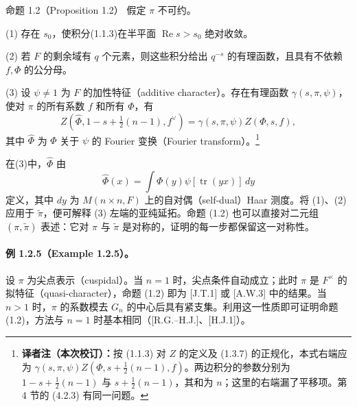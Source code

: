 \begin{originaltheorem}{命题 1.2（Proposition 1.2）}
假定 $\pi$ 不可约。

(1) 存在 $s_0$，使积分(1.1.3)在半平面 $\operatorname{Re}s>s_0$ 绝对收敛。

(2) 若 $F$ 的剩余域有 $q$ 个元素，则这些积分给出 $q^{-s}$ 的有理函数，且具有不依赖 $f,\Phi$ 的公分母。

(3) 设 $\psi\neq1$ 为 $F$ 的加性特征（additive character）。存在有理函数 $\gamma(s,\pi,\psi)$，使对 $\pi$ 的所有系数 $f$ 和所有 $\Phi$，有
\begin{equation}
 Z(\widehat\Phi,1-s+\tfrac12(n-1),f^\vee)
 =\gamma(s,\pi,\psi)Z(\Phi,s,f),\tag{1.2.3}
\end{equation}
其中 $\widehat\Phi$ 为 $\Phi$ 关于 $\psi$ 的 Fourier 变换（Fourier transform）。\footnote{\textbf{译者注（本次校订）：}按 (1.1.3) 对 $Z$ 的定义及 (1.3.7) 的正规化，本式右端应为 $\gamma(s,\pi,\psi)Z(\Phi,s+\tfrac12(n-1),f)$。两边积分的参数分别为 $1-s+\tfrac12(n-1)$ 与 $s+\tfrac12(n-1)$，其和为 $n$；这里的右端漏了平移项。第 4 节的 (4.2.3) 有同一问题。}
\end{originaltheorem}
在(3)中，$\widehat\Phi$ 由
\begin{equation}
 \widehat\Phi(x)=\int\Phi(y)\psi[\operatorname{tr}(yx)]\,dy\tag{1.2.4}
\end{equation}
定义，其中 $dy$ 为 $M(n\times n,F)$ 上的自对偶（self-dual）Haar 测度。将 (1)、(2) 应用于 $\widetilde\pi$，便可解释 (3) 左端的亚纯延拓。命题 (1.2) 也可以直接对二元组 $(\pi,\widetilde\pi)$ 表述：它对 $\pi$ 与 $\widetilde\pi$ 是对称的，证明的每一步都保留这一对称性。

\paragraph*{例 1.2.5（Example 1.2.5）。}
设 $\pi$ 为尖点表示（cuspidal）。当 $n=1$ 时，尖点条件自动成立；此时 $\pi$ 是 $F^\times$ 的拟特征（quasi-character），命题 (1.2) 即为 [J.T.1] 或 [A.W.3] 中的结果。当 $n>1$ 时，$\pi$ 的系数模去 $G_n$ 的中心后具有紧支集。利用这一性质即可证明命题 (1.2)，方法与 $n=1$ 时基本相同（[R.G.--H.J.]、[H.J.1]）。

